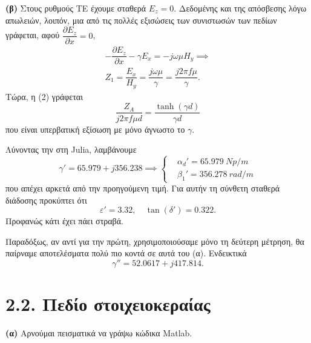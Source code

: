\documentclass[12pt]{article}
\begin{document}
\textbf{(β)} Στους ρυθμούς TE έχουμε σταθερά \(E_z = 0\). Δεδομένης και της απόσβεσης λόγω απωλειών, λοιπόν, μια από τις πολλές εξισώσεις των συνιστωσών των πεδίων γράφεται, αφού \(\dfrac{\partial E_z }{\partial x } = 0 \), 
\begin{gather}
    - \dfrac{\partial E_z }{\partial x } - \gamma E_x = -j\omega \mu H_y \implies \\
    Z_1 = \dfrac{E_x }{H_y } = \dfrac{j\omega \mu }{\gamma} = \dfrac{j2\pi f \mu }{\gamma}. 
\end{gather}
Τώρα, η (2) γράφεται 
\begin{equation}
    \dfrac{Z_A }{j2\pi f \mu d} = \dfrac{\tanh(\gamma d)}{\gamma d} 
\end{equation}
που είναι υπερβατική εξίσωση με μόνο άγνωστο το \(\gamma\). 

Λύνοντας την στη Julia, λαμβάνουμε 
\[
    \gamma' = 65.979 + j356.238 \implies 
     \left\{   \begin{aligned}
            & \alpha_d' = \SI{65.979}{Np/m} \\ 
            & \beta_1' = \SI{356.278}{rad/m}
        \end{aligned}
     \right.
\]
που απέχει αρκετά από την προηγούμενη τιμή. Για αυτήν τη σύνθετη σταθερά διάδοσης προκύπτει ότι 
\[
    \varepsilon' = 3.32, \quad \tan(\delta ') = 0.322.
\]
Προφανώς κάτι έχει πάει στραβά. 

Παραδόξως, αν αντί για την πρώτη, χρησιμοποιούσαμε μόνο τη δεύτερη μέτρηση, θα παίρναμε αποτελέσματα πολύ πιο κοντά σε αυτά του (α). Ενδεικτικά 
\begin{equation}
    \gamma'' = 52.0617 + j417.814. 
\end{equation}

\newpage
\section*{2.2. Πεδίο στοιχειοκεραίας}

\textbf{(α)} Αρνούμαι πεισματικά να γράψω κώδικα Matlab. 
\end{document}
